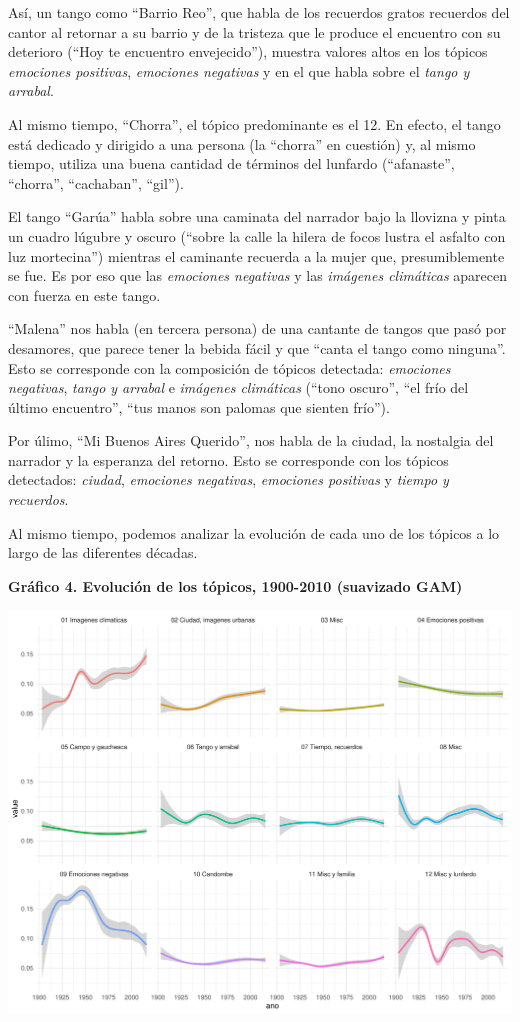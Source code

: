 \documentclass[]{article}
\begin{document}
Así, un tango como ``Barrio Reo'', que habla de los recuerdos gratos
recuerdos del cantor al retornar a su barrio y de la tristeza que le
produce el encuentro con su deterioro (``Hoy te encuentro envejecido''),
muestra valores altos en los tópicos \emph{emociones positivas},
\emph{emociones negativas} y en el que habla sobre el \emph{tango y
arrabal}.

Al mismo tiempo, ``Chorra'', el tópico predominante es el 12. En efecto,
el tango está dedicado y dirigido a una persona (la ``chorra'' en
cuestión) y, al mismo tiempo, utiliza una buena cantidad de términos del
lunfardo (``afanaste'', ``chorra'', ``cachaban'', ``gil'').

El tango ``Garúa'' habla sobre una caminata del narrador bajo la
llovizna y pinta un cuadro lúgubre y oscuro (``sobre la calle la hilera
de focos lustra el asfalto con luz mortecina'') mientras el caminante
recuerda a la mujer que, presumiblemente se fue. Es por eso que las
\emph{emociones negativas} y las \emph{imágenes climáticas} aparecen con
fuerza en este tango.

``Malena'' nos habla (en tercera persona) de una cantante de tangos que
pasó por desamores, que parece tener la bebida fácil y que ``canta el
tango como ninguna''. Esto se corresponde con la composición de tópicos
detectada: \emph{emociones negativas}, \emph{tango y arrabal} e
\emph{imágenes climáticas} (``tono oscuro'', ``el frío del último
encuentro'', ``tus manos son palomas que sienten frío'').

Por úlimo, ``Mi Buenos Aires Querido'', nos habla de la ciudad, la
nostalgia del narrador y la esperanza del retorno. Esto se corresponde
con los tópicos detectados: \emph{ciudad}, \emph{emociones negativas},
\emph{emociones positivas} y \emph{tiempo y recuerdos}.

Al mismo tiempo, podemos analizar la evolución de cada uno de los
tópicos a lo largo de las diferentes décadas.

\textbf{Gráfico 4. Evolución de los tópicos, 1900-2010 (suavizado GAM)}

\includegraphics{Notebook_files/figure-latex/unnamed-chunk-4-1.pdf}
\end{document}
